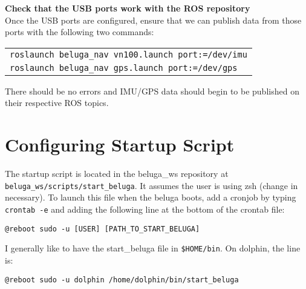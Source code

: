 \documentclass{article}
\begin{document}
{\bf Check that the USB ports work with the ROS repository} \\
Once the USB ports are configured, ensure that we can publish data from those ports with the following two commands:
\begin{center}
\begin{tabular}{l}
\texttt{roslaunch beluga\_nav vn100.launch port:=/dev/imu} \\
\texttt{roslaunch beluga\_nav gps.launch port:=/dev/gps}
\end{tabular}
\end{center}
There should be no errors and IMU/GPS data should begin to be published on their respective ROS topics.

\section*{Configuring Startup Script}
The startup script is located in the beluga\_ws repository at \texttt{beluga\_ws/scripts/start\_beluga}.
It assumes the user is using zsh (change in necessary).
To launch this file when the beluga boots, add a cronjob by typing \texttt{crontab -e} and adding the following line at the bottom of the crontab file:

\begin{verbatim}
@reboot sudo -u [USER] [PATH_TO_START_BELUGA]
\end{verbatim}

I generally like to have the start\_beluga file in \texttt{\$HOME/bin}. On dolphin, the line is:
\begin{verbatim}
@reboot sudo -u dolphin /home/dolphin/bin/start_beluga
\end{verbatim}
\end{document}
